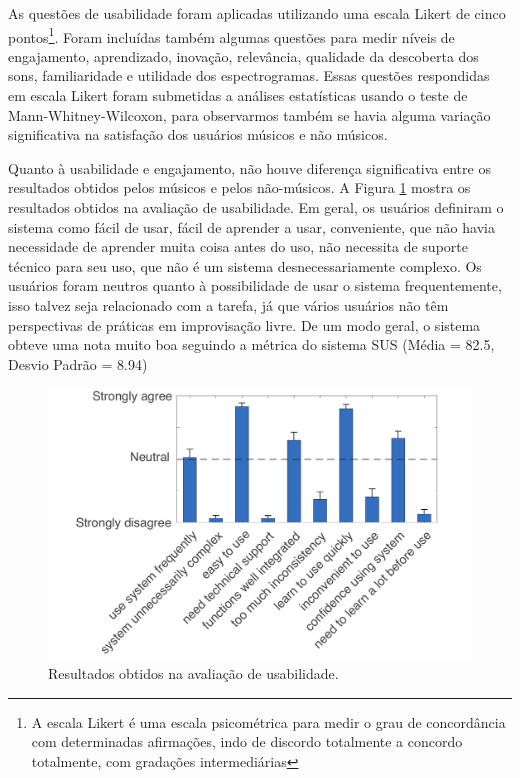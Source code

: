 As questões de usabilidade foram aplicadas utilizando uma escala Likert de cinco pontos\footnote{A escala Likert é uma escala psicométrica para medir o grau de concordância com determinadas afirmações, indo de discordo totalmente a concordo totalmente, com gradações intermediárias}. Foram incluídas também algumas questões para medir níveis de engajamento, aprendizado, inovação, relevância, qualidade da descoberta dos sons, familiaridade e utilidade dos espectrogramas. Essas questões respondidas em escala Likert foram submetidas a análises estatísticas usando o teste de Mann-Whitney-Wilcoxon, para observarmos também se havia alguma variação significativa na satisfação dos usuários músicos e não músicos.

Quanto à usabilidade e engajamento, não houve diferença significativa entre os resultados obtidos pelos músicos e pelos não-músicos. A Figura \ref{fig:SUS} mostra os resultados obtidos na avaliação de usabilidade. Em geral, os usuários definiram o sistema como fácil de usar, fácil de aprender a usar, conveniente, que não havia necessidade de aprender muita coisa antes do uso, não necessita de suporte técnico para seu uso, que não é um sistema desnecessariamente complexo. Os usuários foram neutros quanto à possibilidade de usar o sistema frequentemente, isso talvez seja relacionado com a tarefa, já que vários usuários não têm perspectivas de práticas em improvisação livre. De um modo geral, o sistema obteve uma nota muito boa seguindo a métrica do sistema SUS (Média = 82.5, Desvio Padrão = 8.94)

\begin{figure}

\includegraphics[width=1\textwidth]{pictures/cap4/SUS_lower}
\caption{Resultados obtidos na avaliação de usabilidade.}
\label{fig:SUS}
\end{figure}

